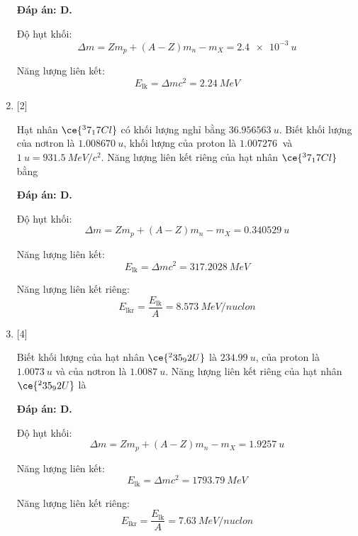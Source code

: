 \begin{enumerate}[label=\bfseries Câu \arabic*:]
	\loigiai
	{		\textbf{Đáp án: D.}
		
		Độ hụt khối:
		$$\Delta m = Zm_p + (A-Z)m_n - m_X = \SI{2.4e-3}{u}$$
		
		Năng lượng liên kết:
		$$E_\text{lk} = \Delta m c^2 = \SI{2.24}{MeV}$$
		
	}
	\item {} [2]
	\cauhoi
	{Hạt nhân $\ce{^37_17 Cl}$ có khối lượng nghỉ bằng $\SI{36.956563}{u}$. Biết khối lượng của nơtron là $\SI{1.008670}{u}$, khối lượng của proton là $\SI{1.007276}{}$ và $\SI{1}{u} = \SI{931.5}{MeV/c^2}$. Năng lượng liên kết riêng của hạt nhân $\ce{^37_17 Cl}$ bằng
	}
	
	\loigiai
	{		\textbf{Đáp án: D.}
		
		Độ hụt khối:
		$$\Delta m = Zm_p + (A-Z)m_n - m_X = \SI{0.340529}{u}$$
		
		Năng lượng liên kết:
		$$E_\text{lk} = \Delta m c^2 = \SI{317.2028}{MeV}$$
		
		Năng lượng liên kết riêng:
		$$E_\text{lkr} = \dfrac{E_\text{lk}}{A} =\SI{8.573}{MeV/nuclon} $$
		
	}
	
	\item {} [4]
	\cauhoi
	{Biết khối lượng của hạt nhân $\ce{^235_92 U}$ là $\SI{234.99}{u}$, của proton là $\SI{1.0073}{u}$ và của nơtron là $\SI{1.0087}{u}$. Năng lượng liên kết riêng của hạt nhân $\ce{^235_92 U}$ là
	}
	
	\loigiai
	{		\textbf{Đáp án: D.}
		
		Độ hụt khối:
		$$\Delta m = Zm_p + (A-Z)m_n - m_X = \SI{1.9257}{u}$$
		
		Năng lượng liên kết:
		$$E_\text{lk} = \Delta m c^2 = \SI{1793.79}{MeV}$$
		
		Năng lượng liên kết riêng:
		$$E_\text{lkr} = \dfrac{E_\text{lk}}{A} =\SI{7.63}{MeV/nuclon} $$
		
}
\end{enumerate}
